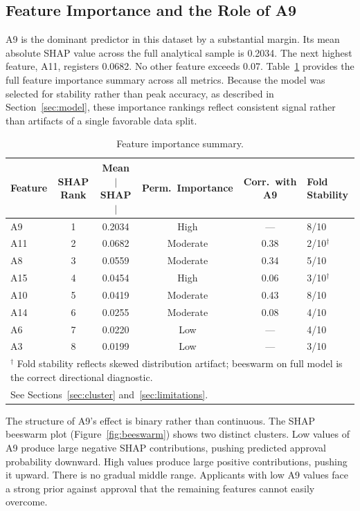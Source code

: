 \documentclass[11pt]{article}
\newcommand{\rowhead}{\rowcolor{NavyReport!15}}
\newcommand{\rowalt}{\rowcolor{LightGray}}
\begin{document}
\subsection{Feature Importance and the Role of A9}

A9 is the dominant predictor in this dataset by a substantial margin. Its mean absolute SHAP value across the full analytical sample is 0.2034. The next highest feature, A11, registers 0.0682. No other feature exceeds 0.07. Table~\ref{tab:importance} provides the full feature importance summary across all metrics. Because the model was selected for stability rather than peak accuracy, as described in Section~\ref{sec:model}, these importance rankings reflect consistent signal rather than artifacts of a single favorable data split.

\begin{table}[H]
\centering
\caption{Feature importance summary.}
\label{tab:importance}
\setlength{\arrayrulewidth}{0.4pt}
\begin{tabular}{lccccl}
\toprule
\rowhead
\color{white}\textbf{Feature} &
\color{white}\textbf{SHAP Rank} &
\color{white}\textbf{Mean $|$SHAP$|$} &
\color{white}\textbf{Perm.\ Importance} &
\color{white}\textbf{Corr.\ with A9} &
\color{white}\textbf{Fold Stability} \\
\midrule
A9  & 1 & 0.2034 & High     & ---  & 8/10 \\
\rowalt
A11 & 2 & 0.0682 & Moderate & 0.38 & 2/10$^\dagger$ \\
A8  & 3 & 0.0559 & Moderate & 0.34 & 5/10 \\
\rowalt
A15 & 4 & 0.0454 & High     & 0.06 & 3/10$^\dagger$ \\
A10 & 5 & 0.0419 & Moderate & 0.43 & 8/10 \\
\rowalt
A14 & 6 & 0.0255 & Moderate & 0.08 & 4/10 \\
A6  & 7 & 0.0220 & Low      & ---  & 4/10 \\
\rowalt
A3  & 8 & 0.0199 & Low      & ---  & 3/10 \\
\bottomrule
\multicolumn{6}{l}{\footnotesize $^\dagger$ Fold stability reflects skewed distribution artifact; beeswarm on full model is the correct directional diagnostic.}\\
\multicolumn{6}{l}{\footnotesize See Sections~\ref{sec:cluster} and~\ref{sec:limitations}.}
\end{tabular}
\end{table}

The structure of A9's effect is binary rather than continuous. The SHAP beeswarm plot (Figure~\ref{fig:beeswarm}) shows two distinct clusters. Low values of A9 produce large negative SHAP contributions, pushing predicted approval probability downward. High values produce large positive contributions, pushing it upward. There is no gradual middle range. Applicants with low A9 values face a strong prior against approval that the remaining features cannot easily overcome.
\end{document}

